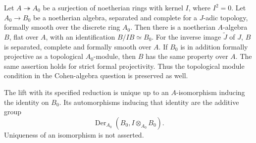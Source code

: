 \begin{theorem}
\label{SA23-A-16}
Let $A\twoheadrightarrow A_0$ be a surjection of noetherian rings
with kernel $I$, where $I^2=0$. Let $A_0\to B_0$ be a noetherian
algebra, separated and complete for a $J$-adic topology, formally
smooth over the discrete ring $A_0$. Then there is a noetherian
$A$-algebra $B$, flat over $A$, with an identification
$B/IB\simeq B_0$. For the inverse image $\widetilde J$ of $J$,
$B$ is separated, complete and formally smooth over $A$.
If $B_0$ is in addition formally projective as a topological
$A_0$-module, then $B$ has the same property over $A$.
The same assertion holds for strict formal projectivity.
Thus the topological module condition in the Cohen-algebra
question is preserved as well.

The lift with its specified reduction is unique up to an
$A$-isomorphism inducing the identity on $B_0$. Its automorphisms
inducing that identity are the additive group
\[
 \operatorname{Der}_{A_0}(B_0,I\otimes_{A_0}B_0).
\]
Uniqueness of an isomorphism is not asserted.
\end{theorem}
